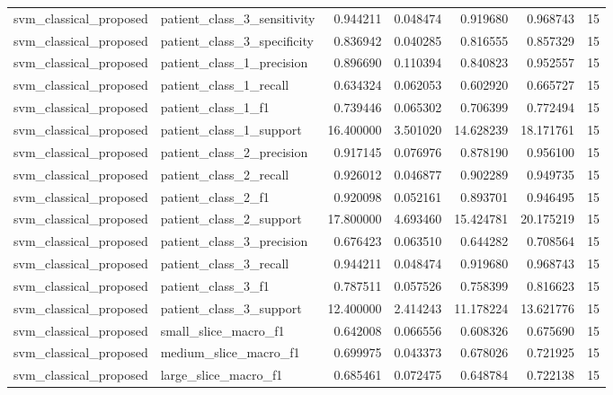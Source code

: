 \begin{tabular}{llrrrrr}
svm_classical_proposed & patient_class_3_sensitivity & 0.944211 & 0.048474 & 0.919680 & 0.968743 & 15 \\
svm_classical_proposed & patient_class_3_specificity & 0.836942 & 0.040285 & 0.816555 & 0.857329 & 15 \\
svm_classical_proposed & patient_class_1_precision & 0.896690 & 0.110394 & 0.840823 & 0.952557 & 15 \\
svm_classical_proposed & patient_class_1_recall & 0.634324 & 0.062053 & 0.602920 & 0.665727 & 15 \\
svm_classical_proposed & patient_class_1_f1 & 0.739446 & 0.065302 & 0.706399 & 0.772494 & 15 \\
svm_classical_proposed & patient_class_1_support & 16.400000 & 3.501020 & 14.628239 & 18.171761 & 15 \\
svm_classical_proposed & patient_class_2_precision & 0.917145 & 0.076976 & 0.878190 & 0.956100 & 15 \\
svm_classical_proposed & patient_class_2_recall & 0.926012 & 0.046877 & 0.902289 & 0.949735 & 15 \\
svm_classical_proposed & patient_class_2_f1 & 0.920098 & 0.052161 & 0.893701 & 0.946495 & 15 \\
svm_classical_proposed & patient_class_2_support & 17.800000 & 4.693460 & 15.424781 & 20.175219 & 15 \\
svm_classical_proposed & patient_class_3_precision & 0.676423 & 0.063510 & 0.644282 & 0.708564 & 15 \\
svm_classical_proposed & patient_class_3_recall & 0.944211 & 0.048474 & 0.919680 & 0.968743 & 15 \\
svm_classical_proposed & patient_class_3_f1 & 0.787511 & 0.057526 & 0.758399 & 0.816623 & 15 \\
svm_classical_proposed & patient_class_3_support & 12.400000 & 2.414243 & 11.178224 & 13.621776 & 15 \\
svm_classical_proposed & small_slice_macro_f1 & 0.642008 & 0.066556 & 0.608326 & 0.675690 & 15 \\
svm_classical_proposed & medium_slice_macro_f1 & 0.699975 & 0.043373 & 0.678026 & 0.721925 & 15 \\
svm_classical_proposed & large_slice_macro_f1 & 0.685461 & 0.072475 & 0.648784 & 0.722138 & 15 \\
\bottomrule
\end{tabular}
